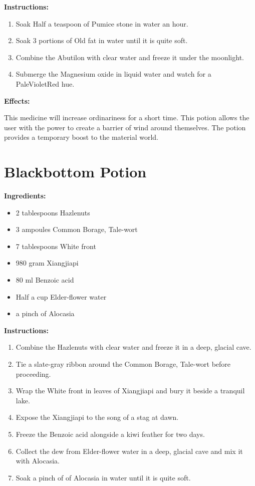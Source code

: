 \documentclass{article}
\begin{document}
\textbf{Instructions:}

\begin{enumerate}
  \item Soak Half a teaspoon of Pumice stone in water an hour.
  \item Soak 3 portions of Old fat in water until it is quite soft.
  \item Combine the Abutilon with clear water and freeze it under the moonlight.
  \item Submerge the Magnesium oxide in liquid water and watch for a PaleVioletRed hue.
\end{enumerate}

\textbf{Effects:}

This medicine will increase ordinariness for a short time. This potion allows the user with the power to create a barrier of wind around themselves. The potion provides a temporary boost to the material world.

\newpage
\section*{Blackbottom Potion}

\textbf{Ingredients:}

\begin{itemize}
  \item 2 tablespoons Hazlenuts
  \item 3 ampoules Common Borage, Tale-wort
  \item 7 tablespoons White front
  \item 980 gram Xiangjiapi
  \item 80 ml Benzoic acid
  \item Half a cup Elder-flower water
  \item a pinch of Alocasia
\end{itemize}

\textbf{Instructions:}

\begin{enumerate}
  \item Combine the Hazlenuts with clear water and freeze it in a deep, glacial cave.
  \item Tie a slate-gray ribbon around the Common Borage, Tale-wort before proceeding.
  \item Wrap the White front in leaves of Xiangjiapi and bury it beside a tranquil lake.
  \item Expose the Xiangjiapi to the song of a stag at dawn.
  \item Freeze the Benzoic acid alongside a kiwi feather for two days.
  \item Collect the dew from Elder-flower water in a deep, glacial cave and mix it with Alocasia.
  \item Soak a pinch of of Alocasia in water until it is quite soft.
\end{enumerate}
\end{document}
